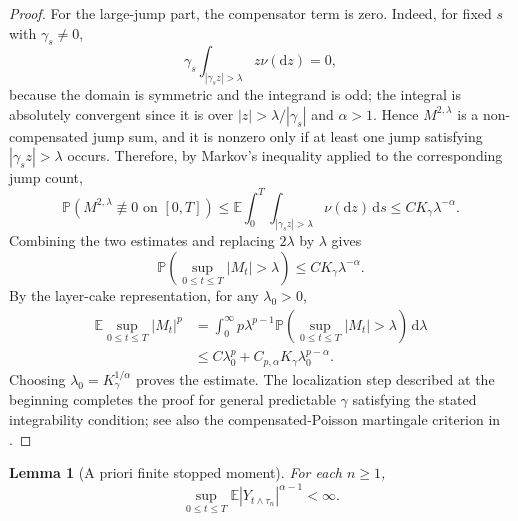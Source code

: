 \documentclass[10pt,a4paper]{amsart}
\newtheorem{lemma}[theorem]{Lemma}
\newcommand{\E}{\mathbb{E}}
\newcommand{\Pbb}{\mathbb{P}}
\newcommand{\1}{\mathbf{1}}
\newcommand{\dd}{\,\mathrm{d}}
\newcommand{\md}{\mathrm{d}}
\begin{document}
\begin{proof}
For the large-jump part, the compensator term is zero. Indeed, for fixed $s$ with $\gamma_s\ne0$,
\[
  \gamma_s\int_{|\gamma_s z|>\lambda}z\nu(\md z)=0,
\]
because the domain is symmetric and the integrand is odd; the integral is absolutely convergent since it is over $|z|>\lambda/|\gamma_s|$ and $\alpha>1$. Hence $M^{2,\lambda}$ is a non-compensated jump sum, and it is nonzero only if at least one jump satisfying $|\gamma_s z|>\lambda$ occurs. Therefore, by Markov's inequality applied to the corresponding jump count,
\[
\Pbb\left(M^{2,\lambda}\not\equiv0\text{ on }[0,T]\right)
\le \E\int_0^T\int_{|\gamma_s z|>\lambda}\nu(\md z)\dd s
\le C K_\gamma\lambda^{-\alpha}.
\]
Combining the two estimates and replacing $2\lambda$ by $\lambda$ gives
\[
  \Pbb\left(\sup_{0\le t\le T}|M_t|>\lambda\right)
  \le C K_\gamma\lambda^{-\alpha}.
\]
By the layer-cake representation, for any $\lambda_0>0$,
\begin{align*}
\E\sup_{0\le t\le T}|M_t|^p
&=\int_0^\infty p\lambda^{p-1}\Pbb\left(\sup_{0\le t\le T}|M_t|>\lambda\right)\dd\lambda\\
&\le C\lambda_0^p+C_{p,\alpha}K_\gamma\lambda_0^{p-\alpha}.
\end{align*}
Choosing $\lambda_0=K_\gamma^{1/\alpha}$ proves the estimate. The localization step described at the beginning completes the proof for general predictable $\gamma$ satisfying the stated integrability condition; see also the compensated-Poisson martingale criterion in \cite[Ch.~II]{IkedaWatanabe1989}.
\end{proof}

\begin{lemma}[A priori finite stopped moment]\label{lem:apriori-stopped}
For each $n\ge1$,
\[
  \sup_{0\le t\le T}\E|Y_{t\wedge\tau_n}|^{\alpha-1}<\infty.
\]
\end{lemma}
\end{document}
